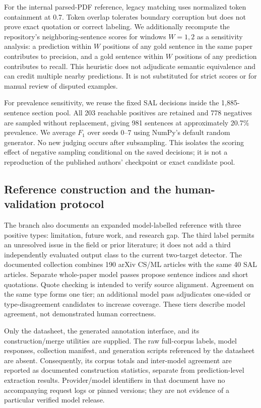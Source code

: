 For the internal parsed-PDF reference, legacy matching uses normalized token containment at 0.7.
Token overlap tolerates boundary corruption but does not prove exact quotation or correct labeling.
We additionally recompute the repository's neighboring-sentence scores for windows $W=1,2$ as a sensitivity analysis: a prediction within $W$ positions of any gold sentence in the same paper contributes to
precision, and a gold sentence within $W$ positions of any prediction contributes to recall. This heuristic does not adjudicate
semantic equivalence and can credit multiple nearby predictions. It is not substituted for strict
scores or for manual review of disputed examples.

For prevalence sensitivity, we reuse the fixed SAL decisions inside the 1,885-sentence section
pool. All 203 reachable positives are retained and 778 negatives are sampled without replacement,
giving 981 sentences at approximately 20.7\% prevalence. We average $F_1$ over seeds 0--7 using
NumPy's default random generator. No new judging occurs after subsampling. This isolates the
scoring effect of negative sampling conditional on the saved decisions; it is not a reproduction
of the published authors' checkpoint or exact candidate pool.

\subsection{Reference construction and the human-validation protocol}
\label{S:reference-protocol}

The branch also documents an expanded model-labelled reference with three positive types:
limitation, future work, and research gap. The third label permits an unresolved issue in the
field or prior literature; it does not add a third independently evaluated output class to the
current two-target detector. The documented collection combines 190 arXiv CS/ML articles with
the same 40 SAL articles. Separate whole-paper model passes propose sentence indices and short
quotations. Quote checking is intended to verify source alignment. Agreement on the same type
forms one tier; an additional model pass adjudicates one-sided or type-disagreement candidates
to increase coverage. These tiers describe model agreement, not demonstrated human correctness.

Only the datasheet, the generated annotation interface, and its construction/merge utilities
are supplied. The raw full-corpus labels, model responses, collection manifest, and generation
scripts referenced by the datasheet are absent. Consequently, its corpus totals and inter-model
agreement are reported as documented construction statistics, separate from prediction-level
extraction results. Provider/model identifiers in that document have no accompanying request
logs or pinned versions; they are not evidence of a particular verified model release.

